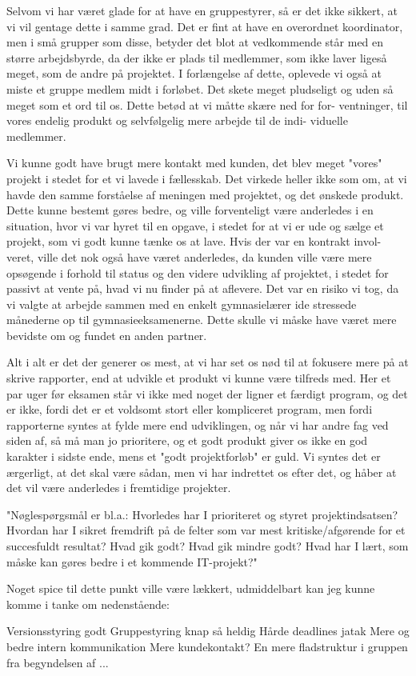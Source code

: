 \documentclass[10pt,a4paper,danish]{article}
\begin{document}
Selvom vi har været glade for at have en gruppestyrer, så er det ikke sikkert,
at vi vil gentage dette i samme grad. Det er fint at have en overordnet
koordinator, men i små grupper som disse, betyder det blot at vedkommende står
med en større arbejdsbyrde, da der ikke er plads til medlemmer, som ikke laver
ligeså meget, som de andre på projektet. I forlængelse af dette, oplevede vi
også at miste et gruppe medlem midt i forløbet. Det skete meget pludseligt og
uden så meget som et ord til os. Dette betød at vi måtte skære ned for for-
ventninger, til vores endelig produkt og selvfølgelig mere arbejde til de indi-
viduelle medlemmer.

Vi kunne godt have brugt mere kontakt med kunden, det blev meget "vores" projekt
i stedet for et vi lavede i fællesskab. Det virkede heller ikke som om, at vi 
havde den samme forståelse af meningen med projektet, og det ønskede produkt.
Dette kunne bestemt gøres bedre, og ville forventeligt være anderledes i en
situation, hvor vi var hyret til en opgave, i stedet for at vi er ude og sælge
et projekt, som vi godt kunne tænke os at lave. Hvis der var en kontrakt invol-
veret, ville det nok også have været anderledes, da kunden ville være mere 
opsøgende i forhold til status og den videre udvikling af projektet, i stedet
for passivt at vente på, hvad vi nu finder på at aflevere. Det var en risiko vi
tog, da vi valgte at arbejde sammen med en enkelt gymnasielærer ide stressede
månederne op til gymnasieeksamenerne. Dette skulle vi måske have været mere
bevidste om og fundet en anden partner.

Alt i alt er det der generer os mest, at vi har set os nød til at fokusere mere
på at skrive rapporter, end at udvikle et produkt vi kunne være tilfreds med.
Her et par uger før eksamen står vi ikke med noget der ligner et færdigt program,
og det er ikke, fordi det er et voldsomt stort eller kompliceret program, men
fordi rapporterne syntes at fylde mere end udviklingen, og når vi har andre fag
ved siden af, så må man jo prioritere, og et godt produkt giver os ikke en god
karakter i sidste ende, mens et "godt projektforløb" er guld. Vi syntes det er
ærgerligt, at det skal være sådan, men vi har indrettet os efter det, og håber
at det vil være anderledes i fremtidige projekter.

"Nøglespørgsmål er bl.a.: Hvorledes har I prioriteret og styret projektindsatsen?
Hvordan har I sikret fremdrift på de felter som var mest kritiske/afgørende for et
succesfuldt resultat? Hvad gik godt? Hvad gik mindre godt? Hvad har I lært, som
måske kan gøres bedre i et kommende IT-projekt?"

Noget spice til dette punkt ville være lækkert, udmiddelbart kan jeg kunne komme i tanke om nedenstående:

Versionsstyring godt
Gruppestyring knap så heldig
Hårde deadlines jatak
Mere og bedre intern kommunikation
Mere kundekontakt?
En mere fladstruktur i gruppen fra begyndelsen af
...
\end{document}
